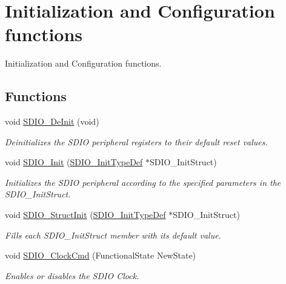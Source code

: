 \hypertarget{group___s_d_i_o___group1}{\section{Initialization and Configuration functions}
\label{group___s_d_i_o___group1}
}


Initialization and Configuration functions.  


\subsection*{Functions}
\begin{DoxyCompactItemize}
\item 
void \hyperlink{group___s_d_i_o___group1_gac359d2c6c67a2590f8f9b720c0e4ff1b}{S\-D\-I\-O\-\_\-\-De\-Init} (void)
\begin{DoxyCompactList}\small\item\em Deinitializes the S\-D\-I\-O peripheral registers to their default reset values. \end{DoxyCompactList}\item 
void \hyperlink{group___s_d_i_o___group1_gad40764a8e37c0ed5c9141ae338ff0203}{S\-D\-I\-O\-\_\-\-Init} (\hyperlink{struct_s_d_i_o___init_type_def}{S\-D\-I\-O\-\_\-\-Init\-Type\-Def} $\ast$S\-D\-I\-O\-\_\-\-Init\-Struct)
\begin{DoxyCompactList}\small\item\em Initializes the S\-D\-I\-O peripheral according to the specified parameters in the S\-D\-I\-O\-\_\-\-Init\-Struct. \end{DoxyCompactList}\item 
void \hyperlink{group___s_d_i_o___group1_ga778d338c29df4fae9ef69432e6df32ad}{S\-D\-I\-O\-\_\-\-Struct\-Init} (\hyperlink{struct_s_d_i_o___init_type_def}{S\-D\-I\-O\-\_\-\-Init\-Type\-Def} $\ast$S\-D\-I\-O\-\_\-\-Init\-Struct)
\begin{DoxyCompactList}\small\item\em Fills each S\-D\-I\-O\-\_\-\-Init\-Struct member with its default value. \end{DoxyCompactList}\item 
void \hyperlink{group___s_d_i_o___group1_ga7243b857d6b323748ff3a493b265bedc}{S\-D\-I\-O\-\_\-\-Clock\-Cmd} (Functional\-State New\-State)
\begin{DoxyCompactList}\small\item\em Enables or disables the S\-D\-I\-O Clock. \end{DoxyCompactList}\item 

\end{DoxyCompactItemize}
